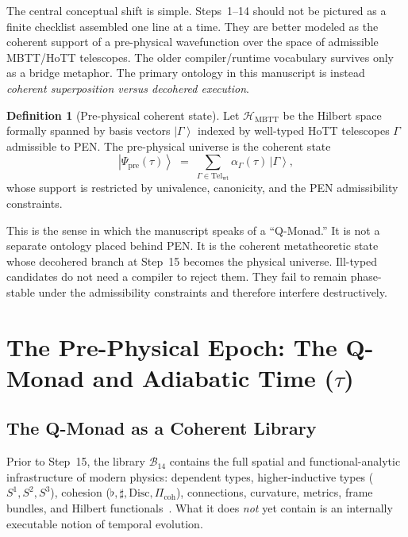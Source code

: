 \documentclass[11pt,a4paper]{article}
\theoremstyle{plain}
\theoremstyle{definition}
\newtheorem{definition}[theorem]{Definition}
\theoremstyle{remark}
\newcommand{\B}{\mathcal{B}}
\newcommand{\Disc}{\mathrm{Disc}}
\newcommand{\HMBTT}{\mathcal{H}_{\mathrm{MBTT}}}
\newcommand{\Tel}{\mathrm{Tel}}
\providecommand{\ket}[1]{\left|#1\right\rangle}
\begin{document}
The central conceptual shift is simple.
Steps~1--14 should not be pictured as a finite checklist assembled one line at a time.
They are better modeled as the coherent support of a pre-physical wavefunction over the space of admissible MBTT/HoTT telescopes.
The older compiler/runtime vocabulary survives only as a bridge metaphor.
The primary ontology in this manuscript is instead \emph{coherent superposition versus decohered execution}.

\begin{definition}[Pre-physical coherent state]
\label{def:qmonad-intro}
Let $\HMBTT$ be the Hilbert space formally spanned by basis vectors $\ket{\Gamma}$ indexed by well-typed HoTT telescopes $\Gamma$ admissible to PEN.
The pre-physical universe is the coherent state
\begin{equation}
\label{eq:qmonad}
    \ket{\Psi_{\mathrm{pre}}(\tau)}
    \;=\;
    \sum_{\Gamma \in \Tel_{\mathrm{wt}}}
    \alpha_{\Gamma}(\tau)\,\ket{\Gamma},
\end{equation}
whose support is restricted by univalence, canonicity, and the PEN admissibility constraints.
\end{definition}

This is the sense in which the manuscript speaks of a ``Q-Monad.''
It is not a separate ontology placed behind PEN.
It is the coherent metatheoretic state whose decohered branch at Step~15 becomes the physical universe.
Ill-typed candidates do not need a compiler to reject them.
They fail to remain phase-stable under the admissibility constraints and therefore interfere destructively.


\section{The Pre-Physical Epoch: The Q-Monad and Adiabatic Time \texorpdfstring{($\tau$)}{(tau)}}
\label{sec:pre-physical}

\subsection{The Q-Monad as a Coherent Library}
\label{sec:assembly}

Prior to Step~15, the library $\B_{14}$ contains the full spatial and functional-analytic infrastructure of modern physics: dependent types, higher-inductive types ($S^1, S^2, S^3$), cohesion ($\flat, \sharp, \Disc, \Pi_{\mathrm{coh}}$), connections, curvature, metrics, frame bundles, and Hilbert functionals~\cite{pen}.
What it does \emph{not} yet contain is an internally executable notion of temporal evolution.
\end{document}
